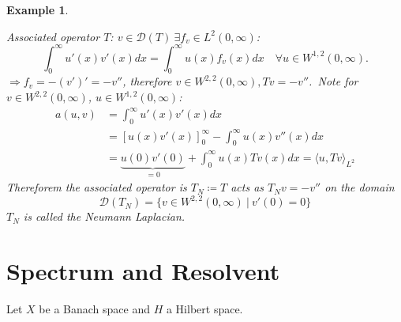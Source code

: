 \documentclass[12pt]{extreport} %
\newcommand{\DO}[1]{\mathcal{D}\left( {#1} \right)}
\theoremstyle{named}
\theoremstyle{nnamed}
\theoremstyle{itshape}
\theoremstyle{normal}
\newtheorem*{example}{Example}
\begin{document}
\begin{example}
\begin{enumerate}
			Associated operator $T$: $v \in \DO{T} ~\exists f_v \in L^2(0, \infty)$:
			$$ \int_0^\infty u'(x) v'(x) dx = \int_0^\infty u(x) f_v(x) dx \quad \forall u \in W^{1,2}(0, \infty). $$
			$\Rightarrow f_v = - \left( v' \right)' = - v''$, therefore $v \in W^{2,2}(0, \infty), Tv = - v''$. Note for $v \in W^{2,2}(0, \infty)$, $u \in W^{1,2}(0, \infty)$:
			\begin{align*}
				a(u, v) & = \int_0^\infty u'(x) v'(x) dx \\
				& = \left[ u(x) v'(x) \right]_0^\infty - \int_0^\infty u(x) v''(x) dx \\
				& = \underbrace{u(0)v'(0)}_{= 0} + \int_0^\infty u(x) T v(x) dx = \langle u, Tv \rangle_{L^2}
			\end{align*}
			Thereforem the associated operator is $T_N \coloneqq T$ acts as $T_N v = - v''$ on the domain 
				$$ \DO{T_N} = \big\{ v \in W^{2,2}(0, \infty) ~|~v'(0) = 0 \big\} $$
				$T_N$ is called the Neumann Laplacian.
	\end{enumerate}	
\end{example}

\chapter{Spectrum and Resolvent}

Let $X$ be a Banach space and $H$ a Hilbert space.
\end{document}
